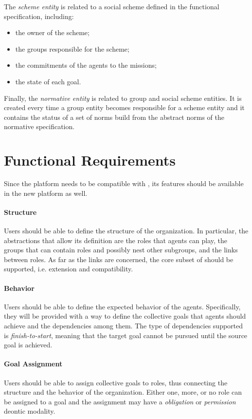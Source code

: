 The \textit{scheme entity} is related to a social scheme defined in the functional specification, including:
\begin{itemize}
    \item the owner of the scheme;
    \item the groups responsible for the scheme;
    \item the commitments of the agents to the missions;
    \item the state of each goal.
\end{itemize}

Finally, the \textit{normative entity} is related to group and social scheme entities.
It is created every time a group entity becomes responsible for a scheme entity and it contains the status of a set of norms build from the abstract norms of the normative specification.

\section{Functional Requirements}
Since the platform needs to be compatible with \moise{}, its features should be available in the new platform as well.

\paragraph{Structure}{
    Users should be able to define the structure of the organization.
    In particular, the abstractions that allow its definition are the roles that agents can play, the groups that can contain roles and possibly nest other subgroups, and the links between roles.
    As far as the links are concerned, the core subset of \moise{} should be supported, i.e. extension and compatibility.
}

\paragraph{Behavior}{
    Users should be able to define the expected behavior of the agents.
    Specifically, they will be provided with a way to define the collective goals that agents should achieve and the dependencies among them.
    The type of dependencies supported is \textit{finish-to-start}, meaning that the target goal cannot be pursued until the source goal is achieved.
}

\paragraph{Goal Assignment}{
    Users should be able to assign collective goals to roles, thus connecting the structure and the behavior of the organization.
    Either one, more, or no role can be assigned to a goal and the assignment may have a \textit{obligation} or \textit{permission} deontic modality.
}

